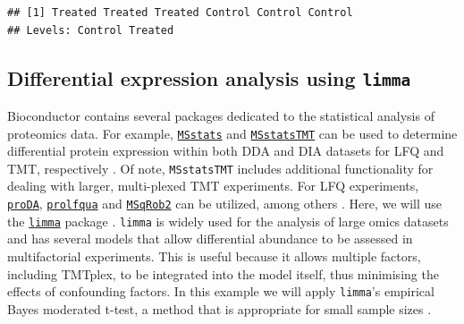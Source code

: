 \documentclass[9pt,a4paper,]{extarticle}
\newenvironment{Shaded}{\begin{snugshade}}{\end{snugshade}}
\newcommand{\AttributeTok}[1]{\textcolor[rgb]{0.77,0.63,0.00}{#1}}
\newcommand{\FunctionTok}[1]{\textcolor[rgb]{0.00,0.00,0.00}{#1}}
\newcommand{\NormalTok}[1]{#1}
\newcommand{\OtherTok}[1]{\textcolor[rgb]{0.56,0.35,0.01}{#1}}
\newcommand{\SpecialCharTok}[1]{\textcolor[rgb]{0.00,0.00,0.00}{#1}}
\newcommand{\StringTok}[1]{\textcolor[rgb]{0.31,0.60,0.02}{#1}}
\begin{document}
\begin{verbatim}
## [1] Treated Treated Treated Control Control Control
## Levels: Control Treated
\end{verbatim}

\begin{Shaded}
\end{Shaded}

\hypertarget{differential-expression-analysis-using-limma}{%
\subsection{\texorpdfstring{Differential expression analysis using \texttt{limma}}{Differential expression analysis using limma}}\label{differential-expression-analysis-using-limma}}

Bioconductor contains several packages dedicated to the statistical analysis of
proteomics data. For example, \href{https://bioconductor.org/packages/3.15/bioc/html/MSstats.html}{\texttt{MSstats}}
and \href{https://bioconductor.org/packages/3.15/bioc/html/MSstatsTMT.html}{\texttt{MSstatsTMT}}
can be used to determine differential protein expression within both DDA and DIA
datasets for LFQ and TMT, respectively \citep{Choi2014, Huang2020}. Of note,
\texttt{MSstatsTMT} includes additional functionality for dealing with larger,
multi-plexed TMT experiments. For LFQ experiments,
\href{https://bioconductor.org/packages/release/bioc/html/proDA.html}{\texttt{proDA}},
\href{https://rdrr.io/github/wolski/prolfqua/}{\texttt{prolfqua}} and
\href{https://www.bioconductor.org/packages/release/bioc/html/msqrob2.html}{\texttt{MSqRob2}}
can be utilized, among others \citep{Goeminne2020, Wolski2023}. Here, we will use the
\href{https://bioconductor.org/packages/release/bioc/html/limma.html}{\texttt{limma}}
package \citep{Ritchie2015}. \texttt{limma} is widely used for the analysis of large omics
datasets and has several models that allow differential abundance to be assessed
in multifactorial experiments. This is useful because it allows multiple factors,
including TMTplex, to be integrated into the model itself, thus minimising the
effects of confounding factors. In this example we will apply \texttt{limma}'s
empirical Bayes moderated t-test, a method that is appropriate for small sample
sizes \citep{Smyth2004}.
\end{document}
